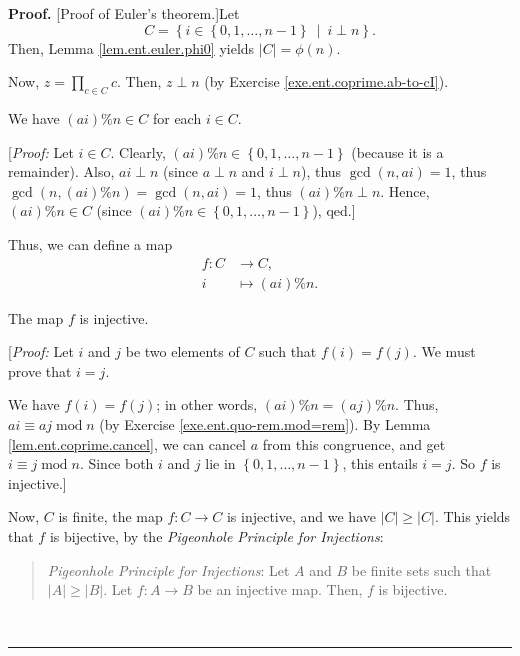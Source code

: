 \documentclass[numbers=enddot,12pt,final,onecolumn,notitlepage]{scrartcl}%
\numberwithin{exer}{subsection}
\theoremstyle{definition}
\newenvironment{statement}{\begin{quote}}{\end{quote}}
\newenvironment{proof}[1][Proof]{\noindent\textbf{#1.} }{\ \rule{0.5em}{0.5em}}
\let\prodnonlimits\prod
\renewcommand{\prod}{\prodnonlimits\limits}
\begin{document}
\begin{proof}
[Proof of Euler's theorem.]Let
\[
C=\left\{  i\in\left\{  0,1,\ldots,n-1\right\}  \ \mid\ i\perp n\right\}  .
\]
Then, Lemma \ref{lem.ent.euler.phi0} yields $\left\vert C\right\vert
=\phi\left(  n\right)  $.

Now, $z=\prod_{c\in C}c$. Then, $z\perp n$ (by Exercise
\ref{exe.ent.coprime.ab-to-cI}).

We have $\left(  ai\right)  \%n\in C$ for each $i\in C$.

[\textit{Proof:} Let $i\in C$. Clearly, $\left(  ai\right)  \%n\in\left\{
0,1,\ldots,n-1\right\}  $ (because it is a remainder). Also, $ai\perp n$
(since $a\perp n$ and $i\perp n$), thus $\gcd\left(  n,ai\right)  =1$, thus
$\gcd\left(  n,\left(  ai\right)  \%n\right)  =\gcd\left(  n,ai\right)  =1$,
thus $\left(  ai\right)  \%n\perp n$. Hence, $\left(  ai\right)  \%n\in C$
(since $\left(  ai\right)  \%n\in\left\{  0,1,\ldots,n-1\right\}  $), qed.]

Thus, we can define a map%
\begin{align*}
f:C  &  \rightarrow C,\\
i  &  \mapsto\left(  ai\right)  \%n.
\end{align*}


The map $f$ is injective.

[\textit{Proof:} Let $i$ and $j$ be two elements of $C$ such that $f\left(
i\right)  =f\left(  j\right)  $. We must prove that $i=j$.

We have $f\left(  i\right)  =f\left(  j\right)  $; in other words, $\left(
ai\right)  \%n=\left(  aj\right)  \%n$. Thus, $ai\equiv aj\operatorname{mod}n$
(by Exercise \ref{exe.ent.quo-rem.mod=rem}). By Lemma
\ref{lem.ent.coprime.cancel}, we can cancel $a$ from this congruence, and get
$i\equiv j\operatorname{mod}n$. Since both $i$ and $j$ lie in $\left\{
0,1,\ldots,n-1\right\}  $, this entails $i=j$. So $f$ is injective.]

Now, $C$ is finite, the map $f:C\rightarrow C$ is injective, and we have
$\left\vert C\right\vert \geq\left\vert C\right\vert $. This yields that $f$
is bijective, by the \textit{Pigeonhole Principle for Injections}:

\begin{statement}
\textit{Pigeonhole Principle for Injections}: Let $A$ and $B$ be finite sets
such that $\left\vert A\right\vert \geq\left\vert B\right\vert $. Let
$f:A\rightarrow B$ be an injective map. Then, $f$ is bijective.
\end{statement}


\end{proof}
\end{document}
